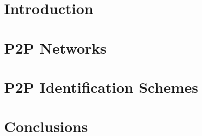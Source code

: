 \documentclass[letter, 12pt]{report}
\begin{document}
%


\newpage

\afterpreface


\renewcommand{\chaptername}{Chapter}
\setcounter{secnumdepth}{3}
\setcounter{tocdepth}{3}

\chapter{Introduction}
\label{sec:intro}



\chapter{P2P Networks}

\chapter{P2P Identification Schemes}


%
%






\chapter{Conclusions}
%

\appendix

\renewcommand{\bibname}{Bibliography}


\end{document}
